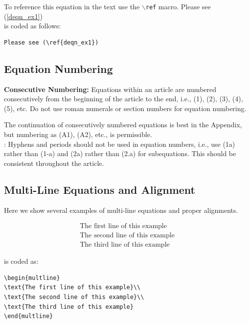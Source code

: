 \documentclass[lettersize,journal]{IEEEtran}
\begin{document}
To reference this equation in the text use the $\backslash${\tt{ref}} macro. 
Please see (\ref{deqn_ex1})\\
\noindent is coded as follows:
\begin{verbatim}
Please see (\ref{deqn_ex1})\end{verbatim}

\subsection{Equation Numbering}
{\bf{Consecutive Numbering:}} Equations within an article are numbered consecutively from the beginning of the
article to the end, i.e., (1), (2), (3), (4), (5), etc. Do not use roman numerals or section numbers for equation numbering.

 The continuation of consecutively numbered equations is best in the Appendix, but numbering
 as (A1), (A2), etc., is permissible.\\

: Hyphens and periods should not be used in equation numbers, i.e., use (1a) rather than
(1-a) and (2a) rather than (2.a) for subequations. This should be consistent throughout the article.

\subsection{Multi-Line Equations and Alignment}
Here we show several examples of multi-line equations and proper alignments.

\begin{multline}
\text{The first line of this example}\\
\text{The second line of this example}\\
\text{The third line of this example}
\end{multline}

\noindent is coded as:
\begin{verbatim}
\begin{multline}
\text{The first line of this example}\\
\text{The second line of this example}\\
\text{The third line of this example}
\end{multline}
\end{verbatim}
\end{document}
